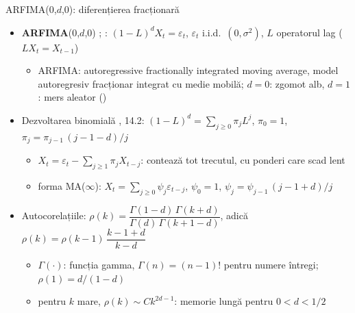 \begin{frame}{ARFIMA(0,$d$,0): diferențierea fracționară}
\itemsize{\footnotesize}
\begin{itemize}
    \item \textbf{ARFIMA}(0,$d$,0) ; : $(1 - L)^d X_t = \varepsilon_t$, $\varepsilon_t$ i.i.d.\ $(0, \sigma^2)$, $L$ operatorul lag ($L X_t = X_{t-1}$)
    \begin{itemize}
        \item ARFIMA: autoregressive fractionally integrated moving average, model autoregresiv fracționar integrat cu medie mobilă; $d = 0$: zgomot alb, $d = 1$: mers aleator ()
    \end{itemize}
    \item Dezvoltarea binomială , 14.2: $(1 - L)^d = \sum_{j \ge 0} \pi_j L^j$, $\pi_0 = 1$, $\pi_j = \pi_{j-1}\,(j - 1 - d)/j$
    \begin{itemize}
        \item $X_t = \varepsilon_t - \sum_{j \ge 1}\pi_j X_{t-j}$: contează tot trecutul, cu ponderi care scad lent
        \item forma MA($\infty$): $X_t = \sum_{j \ge 0}\psi_j\varepsilon_{t-j}$, $\psi_0 = 1$, $\psi_j = \psi_{j-1}\,(j - 1 + d)/j$
    \end{itemize}
    \item Autocorelațiile: $\rho(k) = \dfrac{\Gamma(1 - d)\,\Gamma(k + d)}{\Gamma(d)\,\Gamma(k + 1 - d)}$, adică $\rho(k) = \rho(k - 1)\,\dfrac{k - 1 + d}{k - d}$
    \begin{itemize}
        \item $\Gamma(\cdot)$: funcția gamma, $\Gamma(n) = (n - 1)!$ pentru numere întregi; $\rho(1) = d/(1 - d)$
        \item pentru $k$ mare, $\rho(k) \sim C k^{2d - 1}$: memorie lungă pentru $0 < d < 1/2$
    \end{itemize}
\end{itemize}
\end{frame}

